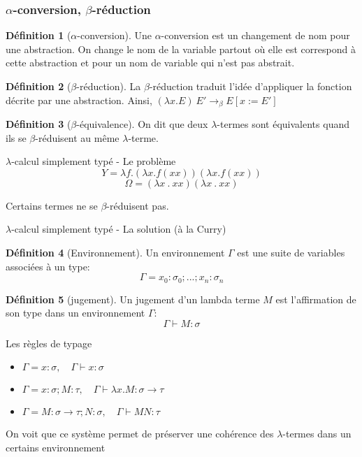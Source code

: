 \documentclass[11pt,a4paper]{beamer}
\theoremstyle{plain}
\theoremstyle{definition}
\newtheorem{defn}{Définition}[section]
\theoremstyle{remark}
\begin{document}
\begin{frame}
\frametitle{$\alpha$-conversion, $\beta$-réduction}
\begin{defn}[$\alpha$-conversion]
Une $\alpha$-conversion est un changement de nom pour une abstraction. On change le nom de la variable partout où elle est correspond à cette abstraction et pour un nom de variable qui n'est pas abstrait.
\end{defn}

\begin{defn}[$\beta$-réduction]
La $\beta$-réduction traduit l'idée d'appliquer la fonction décrite par une abstraction. Ainsi, $(\lambda x.E)~E'\rightarrow_\beta E[x:=E']$ 
\end{defn}

\begin{defn}[$\beta$-équivalence]
On dit que deux $\lambda$-termes sont équivalents quand ils se $\beta$-réduisent au même $\lambda$-terme.
\end{defn}
\end{frame}

\begin{frame}{$\lambda$-calcul simplement typé - Le problème}
$$ Y = \lambda f . (\lambda x. f (xx)) (\lambda x.f (xx))$$
$$ \Omega = (\lambda x \ . \ xx) (\lambda x \ . \ xx) $$

Certains termes ne se $\beta$-réduisent pas.
\end{frame}

\begin{frame}{$\lambda$-calcul simplement typé - La solution (à la Curry)}
\begin{defn}[Environnement]
Un environnement $\Gamma$ est une suite de variables associées à un type: $$\Gamma = x_0:\sigma_0;...;x_n:\sigma_n$$
\end{defn}
\begin{defn}[jugement]
Un jugement d'un lambda terme $M$ est l'affirmation de son type dans un environnement $\Gamma$:
$$ \Gamma \vdash M : \sigma $$
\end{defn}
\end{frame}

\begin{frame}{Les règles de typage}
\begin{itemize}
	\item  $ \Gamma = x:\sigma, \quad \Gamma \vdash x : \sigma $
	\item  $ \Gamma = x:\sigma;M:\tau, \quad \Gamma \vdash \lambda x.M : \sigma \to \tau $
	\item  $ \Gamma = M:\sigma \to \tau; N: \sigma, \quad \Gamma \vdash MN : \tau $
\end{itemize}
On voit que ce système permet de préserver une cohérence des $\lambda$-termes dans un certains environnement
\end{frame}
\end{document}

